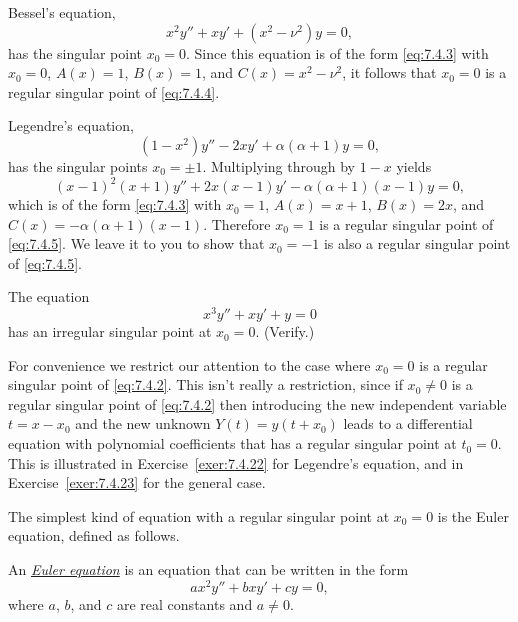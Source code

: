 \begin{example}
  \label{example:7.4.1} \rm Bessel's equation,
  \begin{equation}
    \label{eq:7.4.4}x^{2}y''+xy'+(x^{2}-\nu^{2})y=0,
  \end{equation}
  has the singular point $x_{0}=0$. Since this equation is of the form \eqref{eq:7.4.3} with
  $x_{0}=0$, $A(x)=1$, $B(x)=1$, and $C(x)=x^{2}-\nu^{2}$, it follows that $x_{0}=0$ is a regular
  singular point of \eqref{eq:7.4.4}.
\end{example}

\begin{example}
  \label{example:7.4.2} \rm Legendre's equation,
  \begin{equation}
    \label{eq:7.4.5}(1-x^{2})y''-2xy'+\alpha(\alpha+1)y=0,
  \end{equation}
  has the singular points $x_{0}=\pm1$. Multiplying through by $1-x$ yields
  \[
    (x-1)^{2}(x+1)y''+2x(x-1)y'-\alpha(\alpha+1)(x-1)y=0,
  \]
  which is of the form \eqref{eq:7.4.3} with $x_{0}=1$, $A(x)=x+1$, $B(x)=2x$, and
  $C(x)=-\alpha(\alpha+1)(x-1)$. Therefore $x_{0}=1$ is a regular singular point of
  \eqref{eq:7.4.5}. We leave it to you to show that $x_{0}=-1$ is also a regular singular point of
  \eqref{eq:7.4.5}.
\end{example}
\newpage

\begin{example}
  \label{example:7.4.3} \rm The equation
  \[
    x^{3}y''+xy'+y=0
  \]
  has an irregular singular point at $x_{0}=0$. (Verify.)
\end{example}

For convenience we restrict our attention to the case where $x_{0}=0$ is a regular singular point of
\eqref{eq:7.4.2}. This isn't really a restriction, since if $x_{0}\ne0$ is a regular singular point
of \eqref{eq:7.4.2} then introducing the new independent variable $t=x-x_{0}$ and the new unknown
$Y(t)=y(t+x_{0})$ leads to a differential equation with polynomial coefficients that has a regular
singular point at $t_{0}=0$. This is illustrated in Exercise~\ref{exer:7.4.22} for Legendre's
equation, and in Exercise~\ref{exer:7.4.23} for the general case.


\noindent
The simplest kind of equation with a regular singular point at $x_{0}=0$ is the Euler equation,
defined as follows.

\begin{definition}
  \color{blue}
  \label{thmtype:7.4.2} \rm An
  \href{https://mathshistory.st-andrews.ac.uk/Biographies/Euler/}{\color{blue}
  \it Euler equation\/} is an equation that can be written in the form
  \begin{equation}
    \label{eq:7.4.6}ax^{2}y''+bxy'+cy=0,
  \end{equation}
  where $a$, $b$, and $c$ are real constants and $a\ne0$.
\end{definition}

